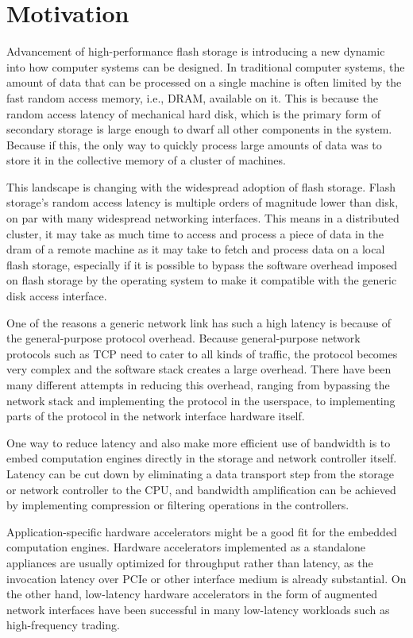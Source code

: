 \section{Motivation}

Advancement of high-performance flash storage is introducing a new dynamic into
how computer systems can be designed.  In traditional computer systems, the
amount of data that can be processed on a single machine is often limited by the
fast random access memory, i.e., DRAM, available on it. This is because the
random access latency of mechanical hard disk, which is the primary form of
secondary storage is large enough to dwarf all other components in the system.
Because if this, the only way to quickly process large amounts of data was to
store it in the collective memory of a cluster of machines.

This landscape is changing with the widespread adoption of flash storage. Flash
storage's random access latency is multiple orders of magnitude lower than disk,
on par with many widespread networking interfaces. This means in a distributed
cluster, it may take as much time to access and process a piece of data in the
dram of a remote machine as it may take to fetch and process data on a local
flash storage, especially if it is possible to bypass the software overhead
imposed on flash storage by the operating system to make it compatible with the
generic disk access interface.

One of the reasons a generic network link has such a high latency is because of
the general-purpose protocol overhead. Because general-purpose network protocols
such as TCP need to cater to all kinds of traffic, the protocol
becomes very complex and the software stack creates a large overhead. There have
been many different attempts in reducing this overhead, ranging from bypassing
the network stack and implementing the protocol in the userspace, to
implementing parts of the protocol in the network interface hardware itself.

One way to reduce latency and also make more efficient use of bandwidth is to
embed computation engines directly in the storage and network controller itself.
Latency can be cut down by eliminating a data transport step from the
storage or network controller to the CPU, and bandwidth amplification can be
achieved by implementing compression or filtering operations in the controllers.

Application-specific hardware accelerators might be a good fit for the embedded
computation engines. Hardware accelerators implemented as a standalone
appliances are usually optimized for throughput rather than latency, as the
invocation latency over PCIe or other interface medium is already substantial.
On the other hand, low-latency hardware accelerators in the form of augmented
network interfaces have been successful in many low-latency workloads such as
high-frequency trading.
